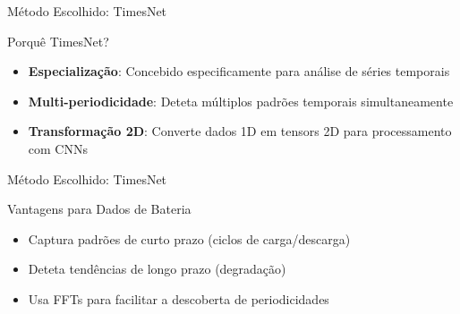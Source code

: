 \documentclass[aspectratio=169,xcolor=dvipsnames]{beamer}
\begin{document}
\begin{frame}{Método Escolhido: TimesNet}
  \begin{block}{Porquê TimesNet?}
    \begin{itemize}
      \item \textbf{Especialização}: Concebido especificamente para análise de séries temporais
      \item \textbf{Multi-periodicidade}: Deteta múltiplos padrões temporais simultaneamente
      \item \textbf{Transformação 2D}: Converte dados 1D em tensors 2D para processamento com CNNs
    \end{itemize}
  \end{block}
  
  \vspace{0.3cm}
  
  \centering
\end{frame}

\begin{frame}{Método Escolhido: TimesNet}
  \begin{exampleblock}{Vantagens para Dados de Bateria}
    \begin{itemize}
      \item Captura padrões de curto prazo (ciclos de carga/descarga)
      \item Deteta tendências de longo prazo (degradação)
      \item Usa FFTs para facilitar a descoberta de periodicidades
    \end{itemize}
  \end{exampleblock}
\end{frame}
\end{document}
